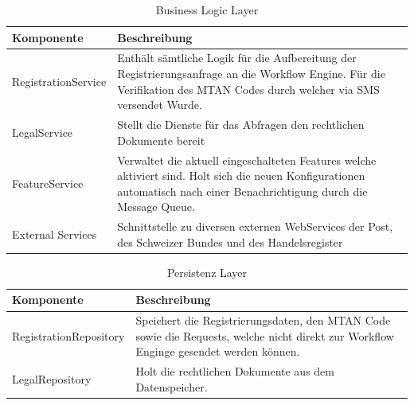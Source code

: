 \begin{table}[H]
	\centering
	\caption{Business Logic Layer}
	\begin{tabular}{ | p{4cm} | p{11cm} | }
		\toprule
		{\textbf{Komponente}} & {\textbf{Beschreibung}} \\
		\midrule
		RegistrationService &  Enthält sämtliche Logik für die Aufbereitung der Registrierungsanfrage an die Workflow Engine. Für die Verifikation des MTAN Codes durch welcher via SMS versendet Wurde.\\ \hline
		LegalService &  Stellt die Dienste für das Abfragen den rechtlichen Dokumente bereit \\ \hline
		FeatureService &  Verwaltet die aktuell eingeschalteten Features welche aktiviert sind. Holt sich die neuen Konfigurationen automatisch nach einer Benachrichtigung durch die Message Queue. \\ \hline
		External Services & Schnittstelle zu diversen externen WebServices der Post, des Schweizer Bundes und des Handelsregister \\
		\bottomrule
	\end{tabular}
\end{table}

\begin{table}[H]
	\centering
	\caption{Persistenz Layer}
	\begin{tabular}{ | p{4cm} | p{11cm} | }
		\toprule
		{\textbf{Komponente}} & {\textbf{Beschreibung}} \\
		\midrule
		RegistrationRepository &  Speichert die Registrierungsdaten, den MTAN Code sowie die Requests, welche nicht direkt zur Workflow Enginge gesendet werden können. \\ \hline
		LegalRepository &  Holt die rechtlichen Dokumente aus dem Datenspeicher. \\
		\bottomrule
	\end{tabular}
\end{table}

